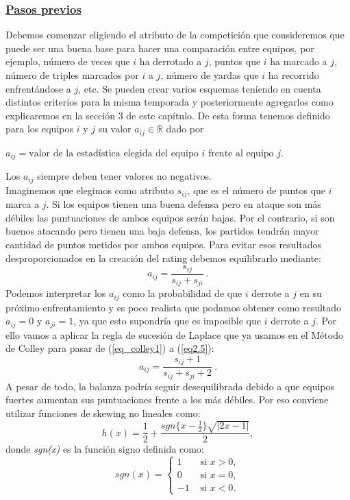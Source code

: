 \subsubsection*{\underline{Pasos previos}}
Debemos comenzar eligiendo el atributo de la competición que consideremos que puede ser una buena base para hacer una comparación entre equipos, por ejemplo, número de veces que $i$ ha derrotado a $j$, puntos que $i$ ha marcado a $j$, número de triples marcados por $i$ a $j$, número de yardas que $i$ ha recorrido enfrentándose a $j$, etc. Se pueden crear varios esquemas teniendo en cuenta distintos criterios para la misma temporada y posteriormente agregarlos como explicaremos en la sección 3 de este capítulo. De esta forma tenemos definido para los equipos $i$ y $j$ su valor $a_{ij} \in \mathbb{R}$ dado por 
\begin{center}
	$a_{ij} = \text{valor de la estadística elegida del equipo }i \text{ frente al equipo } j$.
\end{center}
Los $a_{ij}$ siempre deben tener valores no negativos.\\

Imaginemos que elegimos como atributo $s_{ij}$, que es el número de puntos que $i$ marca a $j$. Si los equipos tienen una buena defensa pero en ataque son más débiles las puntuaciones de ambos equipos serán bajas. Por el contrario, si son buenos atacando pero tienen una baja defensa, los partidos tendrán mayor cantidad de puntos metidos por ambos equipos. Para evitar esos resultados desproporcionados en la creación del rating debemos equilibrarlo mediante:
\begin{equation}
a_{ij} = \dfrac{s_{ij}}{s_{ij}+s_{ji}} \ . 
\end{equation}
Podemos interpretar los $a_{ij}$ como la probabilidad de que $i$ derrote a $j$ en su próximo enfrentamiento y es poco realista que podamos obtener como resultado $a_{ij}=0$ y $a_{ji}=1$, ya que esto supondría que es imposible que $i$ derrote a $j$. Por ello vamos a aplicar la regla de sucesión de Laplace \cite{laplace} que ya usamos en el Método de Colley para pasar de (\ref{eq_colley1}) a (\ref{eq2.5}):
\begin{equation}
a_{ij} = \dfrac{s_{ij}+1}{s_{ij}+s_{ji}+2} \ . \label{formejem6}
\end{equation}
A pesar de todo, la balanza podría seguir desequilibrada debido a que equipos fuertes aumentan sus puntuaciones frente a los más débiles. Por eso conviene utilizar funciones de skewing no lineales \cite[págs 31-32]{libro_rankings} como:
\begin{equation}
h(x) = \frac{1}{2} + \dfrac{sgn\{x-\frac{1}{2}\} \sqrt{|2x-1|}}{2}, 
\end{equation} 
donde \textit{sgn(x)} es la función signo definida como:
\begin{equation*}
sgn(x) = \begin{cases}
1 & \text{ si } x>0,\\
0 & \text{ si } x=0,\\ 
-1 & \text{ si } x<0. 
\end{cases}
\end{equation*}


